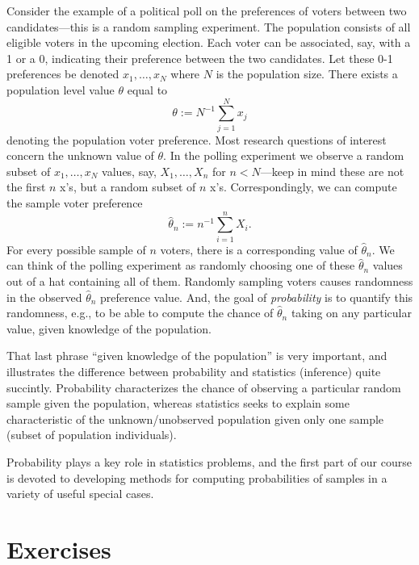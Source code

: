 \documentclass[
]{book}
\theoremstyle{definition}
\theoremstyle{definition}
\theoremstyle{definition}
\theoremstyle{definition}
\theoremstyle{remark}
\begin{document}
Consider the example of a political poll on the preferences of voters between two candidates---this is a random sampling experiment. The population consists of all eligible voters in the upcoming election. Each voter can be associated, say, with a 1 or a 0, indicating their preference between the two candidates. Let these 0-1 preferences be denoted \(x_1, \ldots, x_N\) where \(N\) is the population size. There exists a population level value \(\theta\) equal to
\[\theta:=N^{-1}\sum_{j=1}^N x_j\]
denoting the population voter preference. Most research questions of interest concern the unknown value of \(\theta\). In the polling experiment we observe a random subset of \(x_1, \ldots, x_N\) values, say, \(X_1, \ldots, X_n\) for \(n<N\)---keep in mind these are not the first \(n\) x's, but a random subset of \(n\) x's. Correspondingly, we can compute the sample voter preference
\[\hat\theta_n := n^{-1}\sum_{i=1}^n X_i.\]
For every possible sample of \(n\) voters, there is a corresponding value of \(\hat\theta_n\). We can think of the polling experiment as randomly choosing one of these \(\hat\theta_n\) values out of a hat containing all of them. Randomly sampling voters causes randomness in the observed \(\hat\theta_n\) preference value. And, the goal of \emph{probability} is to quantify this randomness, e.g., to be able to compute the chance of \(\hat\theta_n\) taking on any particular value, given knowledge of the population.

That last phrase ``given knowledge of the population'' is very important, and illustrates the difference between probability and statistics (inference) quite succintly. Probability characterizes the chance of observing a particular random sample given the population, whereas statistics seeks to explain some characteristic of the unknown/unobserved population given only one sample (subset of population individuals).

Probability plays a key role in statistics problems, and the first part of our course is devoted to developing methods for computing probabilities of samples in a variety of useful special cases.

\hypertarget{exercises}{%
\section{Exercises}\label{exercises}}
\end{document}
